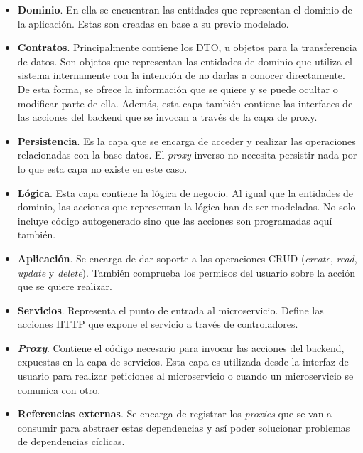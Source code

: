 \documentclass[11pt,spanish,listoffigures]{tfgetsinf}
\begin{document}
\begin{itemize}

	\item \textbf{Dominio}. En ella se encuentran las entidades que representan el dominio de la aplicación. Estas son creadas en base a su previo modelado.

	\item \textbf{Contratos}. Principalmente contiene los DTO, u objetos para la transferencia de datos. Son objetos que representan las entidades de dominio que utiliza el sistema internamente con la intención de no darlas a conocer directamente. De esta forma, se ofrece la información que se quiere y se puede ocultar o modificar parte de ella. Además, esta capa también contiene las interfaces de las acciones del backend que se invocan a través de la capa de proxy.

	\item \textbf{Persistencia}. Es la capa que se encarga de acceder y realizar las operaciones relacionadas con la base datos. El \emph{proxy} inverso no necesita persistir nada por lo que esta capa no existe en este caso.

	\item \textbf{Lógica}. Esta capa contiene la lógica de negocio. Al igual que la entidades de dominio, las acciones que representan la lógica han de ser modeladas. No solo incluye código autogenerado sino que las acciones son programadas aquí también.

	\item \textbf{Aplicación}. Se encarga de dar soporte a las operaciones CRUD (\emph{create}, \emph{read}, \emph{update} y \emph{delete}). También comprueba los permisos del usuario sobre la acción que se quiere realizar.

	\item \textbf{Servicios}. Representa el punto de entrada al microservicio. Define las acciones HTTP que expone el servicio a través de controladores.

	\item \textbf{\emph{Proxy}}. Contiene el código necesario para invocar las acciones del backend, expuestas en la capa de servicios. Esta capa es utilizada desde la interfaz de usuario para realizar peticiones al microservicio o cuando un microservicio se comunica con otro.

	\item \textbf{Referencias externas}. Se encarga de registrar los \emph{proxies} que se van a consumir para abstraer estas dependencias y así poder solucionar problemas de dependencias cíclicas.

\end{itemize}
\end{document}
